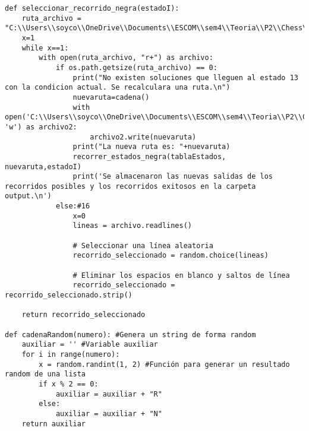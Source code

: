 \begin{lstlisting}
def seleccionar_recorrido_negra(estadoI):
    ruta_archivo = "C:\\Users\\soyco\\OneDrive\\Documents\\ESCOM\\sem4\\Teoria\\P2\\Chess\\output\\recorridos_finales_negra.txt"
    x=1
    while x==1:
        with open(ruta_archivo, "r+") as archivo:
            if os.path.getsize(ruta_archivo) == 0:
                print("No existen soluciones que lleguen al estado 13 con la condicion actual. Se recalculara una ruta.\n")
                nuevaruta=cadena()
                with open('C:\\Users\\soyco\\OneDrive\\Documents\\ESCOM\\sem4\\Teoria\\P2\\Chess\\output\\ruta_negra.txt', 'w') as archivo2:
                    archivo2.write(nuevaruta)
                print("La nueva ruta es: "+nuevaruta)
                recorrer_estados_negra(tablaEstados, nuevaruta,estadoI)
                print('Se almacenaron las nuevas salidas de los recorridos posibles y los recorridos exitosos en la carpeta output.\n')
            else:#16
                x=0  
                lineas = archivo.readlines()
                
                # Seleccionar una línea aleatoria
                recorrido_seleccionado = random.choice(lineas)
                
                # Eliminar los espacios en blanco y saltos de línea
                recorrido_seleccionado = recorrido_seleccionado.strip()
            
    return recorrido_seleccionado

def cadenaRandom(numero): #Genera un string de forma random 
    auxiliar = '' #Variable auxiliar
    for i in range(numero):
        x = random.randint(1, 2) #Función para generar un resultado random de una lista
        if x % 2 == 0:
            auxiliar = auxiliar + "R"
        else:
            auxiliar = auxiliar + "N"
    return auxiliar


\end{lstlisting}
